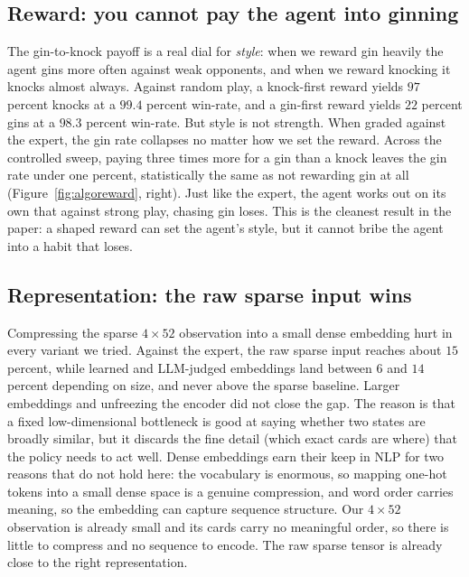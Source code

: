 \documentclass[letterpaper]{article} %
\begin{document}
\subsection{Reward: you cannot pay the agent into ginning}
The gin-to-knock payoff is a real dial for \emph{style}: when we reward gin
heavily the agent gins more often against weak opponents, and when we reward
knocking it knocks almost always. Against random play, a knock-first reward
yields $97$ percent knocks at a $99.4$ percent win-rate, and a gin-first reward
yields $22$ percent gins at a $98.3$ percent win-rate. But style is not strength.
When graded against the expert, the gin rate collapses no matter how we set the
reward. Across the controlled sweep, paying three times more for a gin than a
knock leaves the gin rate under one percent, statistically the same as not
rewarding gin at all (Figure~\ref{fig:algoreward}, right). Just like the expert,
the agent works out on its own that against strong play, chasing gin loses. This
is the cleanest result in the paper: a shaped reward can set the agent's style,
but it cannot bribe the agent into a habit that loses.

\subsection{Representation: the raw sparse input wins}
Compressing the sparse $4\times52$ observation into a small dense embedding hurt
in every variant we tried. Against the expert, the raw sparse input reaches about
$15$ percent, while learned and LLM-judged embeddings land between $6$ and $14$
percent depending on size, and never above the sparse baseline. Larger embeddings
and unfreezing the encoder did not close the gap. The reason is that a fixed
low-dimensional bottleneck is good at saying whether two states are broadly
similar, but it discards the fine detail (which exact cards are where) that the
policy needs to act well. Dense embeddings earn their keep in NLP for two reasons
that do not hold here: the vocabulary is enormous, so mapping one-hot tokens into a
small dense space is a genuine compression, and word order carries meaning, so the
embedding can capture sequence structure. Our $4\times52$ observation is already
small and its cards carry no meaningful order, so there is little to compress and no
sequence to encode. The raw sparse tensor is already close to the right
representation.
\end{document}
